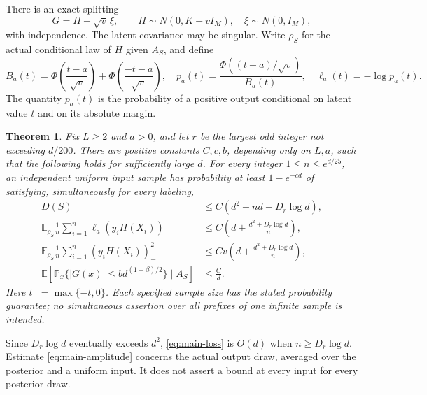\documentclass[11pt]{article}
\newtheorem{theorem}{Theorem}[section]
\theoremstyle{remark}\newtheorem{remark}[theorem]{Remark}
\newcommand{\E}{\mathbb E}
\newcommand{\Pp}{\mathbb P}
\begin{document}
There is an exact splitting
\[
 G=H+\sqrt v\,\xi,\qquad H\sim N(0,K-vI_M),\quad \xi\sim N(0,I_M),
\]
with independence. The latent covariance may be singular. Write $\rho_S$ for the actual conditional law of $H$ given $A_S$, and define
\[
 B_a(t)=\Phi\!\left(\frac{t-a}{\sqrt v}\right)+\Phi\!\left(\frac{-t-a}{\sqrt v}\right),\quad
 p_a(t)=\frac{\Phi((t-a)/\sqrt v)}{B_a(t)},\quad \ell_a(t)=-\log p_a(t).
\]
The quantity $p_a(t)$ is the probability of a positive output conditional on latent value $t$ and on its absolute margin.

\begin{theorem}\label{thm:main}
Fix $L\ge2$ and $a>0$, and let $r$ be the largest odd integer not exceeding $d/200$. There are positive constants $C,c,b$, depending only on $L,a$, such that the following holds for sufficiently large $d$. For every integer $1\le n\le e^{d/25}$, an independent uniform input sample has probability at least $1-e^{-cd}$ of satisfying, simultaneously for every labeling,
\begin{align}
 D(S)&\le C(d^2+nd+D_r\log d),\label{eq:main-denominator}\\
 \E_{\rho_S}\frac1n\sum_{i=1}^n\ell_a(y_iH(X_i))
 &\le C\left(d+\frac{d^2+D_r\log d}{n}\right),\label{eq:main-loss}\\
 \E_{\rho_S}\frac1n\sum_{i=1}^n(y_iH(X_i))_-^2
 &\le Cv\left(d+\frac{d^2+D_r\log d}{n}\right),\label{eq:main-wrong}\\
 \E\!\left[\Pp_x\{|G(x)|\le b d^{(1-\beta)/2}\}\mid A_S\right]
 &\le \frac Cd.\label{eq:main-amplitude}
\end{align}
Here $t_- =\max\{-t,0\}$. Each specified sample size has the stated probability guarantee; no simultaneous assertion over all prefixes of one infinite sample is intended.
\end{theorem}

Since $D_r\log d$ eventually exceeds $d^2$, \eqref{eq:main-loss} is $O(d)$ when $n\ge D_r\log d$. Estimate \eqref{eq:main-amplitude} concerns the actual output draw, averaged over the posterior and a uniform input. It does not assert a bound at every input for every posterior draw.
\end{document}
